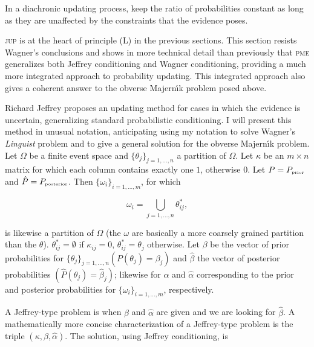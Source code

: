 \documentclass[phd,12pt,oneside]{ubcthesis}
\begin{document}
\begin{quotex}
   In a diachronic updating process, keep the ratio of
  probabilities constant as long as they are unaffected by the
  constraints that the evidence poses.
\end{quotex}

{\noindent}\textsc{jup} is at the heart of principle (L) in the previous
sections. This section resists Wagner's conclusions and shows in more
technical detail than previously that \textsc{pme} generalizes both
Jeffrey conditioning and Wagner conditioning, providing a much more
integrated approach to probability updating. This integrated approach
also gives a coherent answer to the obverse Majern{\'\i}k problem
posed above.

Richard Jeffrey proposes an updating method for cases in which the
evidence is uncertain, generalizing standard probabilistic
conditioning. I will present this method in unusual notation,
anticipating using my notation to solve Wagner's \emph{Linguist}
problem and to give a general solution for the obverse Majern{\'\i}k
problem. Let $\Omega$ be a finite event space and
$\{\theta_{j}\}_{j=1,\ldots,n}$ a partition of $\Omega$. Let $\kappa$
be an $m\times{}n$ matrix for which each column contains exactly one
$1$, otherwise $0$. Let $P=P_{\mbox{\tiny{prior}}}$ and
$\hat{P}=P_{\mbox{\tiny{posterior}}}$. Then
$\{\omega_{i}\}_{i=1,\ldots,m}$, for which

\begin{equation}
  \label{eq:m1}
  \omega_{i}=\bigcup_{j=1,\dots,n}\theta^{*}_{ij},
\end{equation}

{\noindent}is likewise a partition of $\Omega$ (the $\omega$ are
basically a more coarsely grained partition than the $\theta$).
$\theta^{*}_{ij}=\emptyset$ if $\kappa_{ij}=0$,
$\theta^{*}_{ij}=\theta_{j}$ otherwise. Let $\beta$ be the vector of
prior probabilities for $\{\theta_{j}\}_{j=1,\ldots,n}
(P(\theta_{j})=\beta_{j})$ and $\hat{\beta}$ the vector of posterior
probabilities $(\hat{P}(\theta_{j})=\hat{\beta}_{j})$; likewise for
$\alpha$ and $\hat{\alpha}$ corresponding to the prior and posterior
probabilities for $\{\omega_{i}\}_{i=1,\ldots,m}$, respectively.

A Jeffrey-type problem is when $\beta$ and $\hat{\alpha}$ are given
and we are looking for $\hat{\beta}$. A mathematically more concise
characterization of a Jeffrey-type problem is the triple
$(\kappa,\beta,\hat{\alpha})$. The solution, using Jeffrey
conditioning, is
\end{document}
